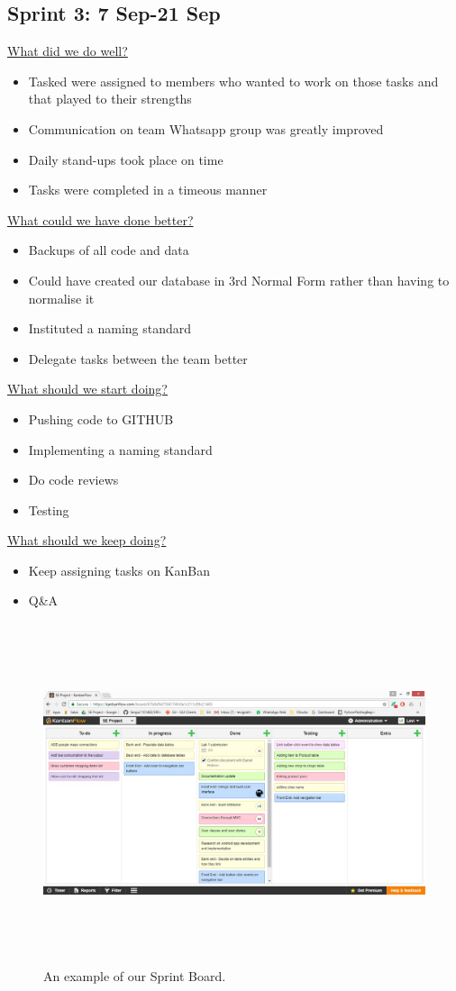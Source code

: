 \documentclass[12pt]{article}
\begin{document}
\subsection{Sprint 3: 7 Sep-21 Sep}
\underline{What did we do well?}
\begin{itemize}
\item Tasked were assigned to members who wanted to work on those tasks and that played to their strengths
\item Communication on team Whatsapp group was greatly improved 
\item Daily stand-ups took place on time
\item Tasks were completed in a timeous manner
\end{itemize}
\underline{What could we have done better?}
\begin{itemize}
\item Backups of all code and data
\item Could have created our database in 3rd Normal Form rather than having to normalise it
\item Instituted a naming standard
\item Delegate tasks between the team better
\end{itemize}
\underline{What should we start doing?}
\begin{itemize}
\item Pushing code to GITHUB 
\item Implementing a naming standard
\item Do code reviews
\item Testing
\end{itemize}
\underline{What should we keep doing?}
\begin{itemize}
\item Keep assigning tasks on KanBan
\item Q\&A
\end{itemize}

\begin{figure}[H]
  \includegraphics[width=15cm,height=10cm]{SprintBoard.jpg}
  \centering
  \caption{An example of our Sprint Board.}
\end{figure}
\end{document}
